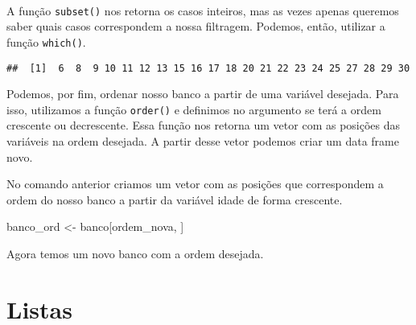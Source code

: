 \documentclass[]{book}
\newenvironment{Shaded}{\begin{snugshade}}{\end{snugshade}}
\newcommand{\DataTypeTok}[1]{\textcolor[rgb]{0.13,0.29,0.53}{#1}}
\newcommand{\DecValTok}[1]{\textcolor[rgb]{0.00,0.00,0.81}{#1}}
\newcommand{\KeywordTok}[1]{\textcolor[rgb]{0.13,0.29,0.53}{\textbf{#1}}}
\newcommand{\NormalTok}[1]{#1}
\newcommand{\OperatorTok}[1]{\textcolor[rgb]{0.81,0.36,0.00}{\textbf{#1}}}
\newcommand{\StringTok}[1]{\textcolor[rgb]{0.31,0.60,0.02}{#1}}
\theoremstyle{definition}
\theoremstyle{definition}
\theoremstyle{definition}
\theoremstyle{remark}
\begin{document}
~

A função \texttt{subset()} nos retorna os casos inteiros, mas as vezes apenas queremos saber quais casos correspondem a nossa filtragem. Podemos, então, utilizar a função \texttt{which()}.

\begin{Shaded}
\end{Shaded}

\begin{verbatim}
##  [1]  6  8  9 10 11 12 13 15 16 17 18 20 21 22 23 24 25 27 28 29 30
\end{verbatim}

Podemos, por fim, ordenar nosso banco a partir de uma variável desejada. Para isso, utilizamos a função \texttt{order()} e definimos no argumento se terá a ordem crescente ou decrescente. Essa função nos retorna um vetor com as posições das variáveis na ordem desejada. A partir desse vetor podemos criar um data frame novo.

\begin{Shaded}
\end{Shaded}

No comando anterior criamos um vetor com as posições que correspondem a ordem do nosso banco a partir da variável idade de forma crescente.

\begin{Shaded}
\begin{Highlighting}[]
\NormalTok{banco_ord <-}\StringTok{ }\NormalTok{banco[ordem_nova, ]}
\end{Highlighting}
\end{Shaded}

Agora temos um novo banco com a ordem desejada.

\hypertarget{listas}{%
\section{Listas}\label{listas}}
\end{document}
